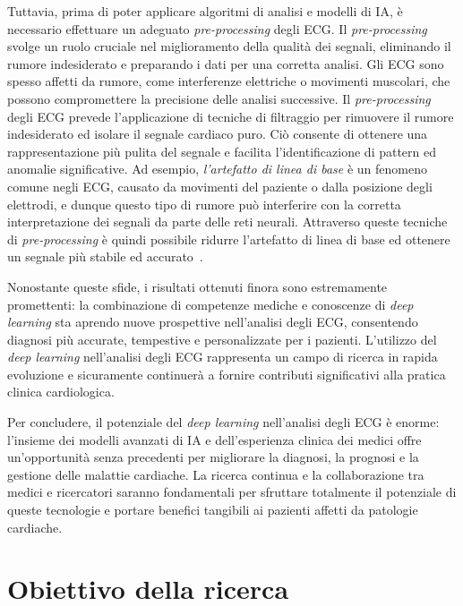 \documentclass[12pt,italian]{report}
\begin{document}
	Tuttavia, prima di poter applicare algoritmi di analisi e modelli di IA, è necessario effettuare un adeguato \textit{pre-processing} degli ECG. Il \textit{pre-processing} svolge un ruolo cruciale nel miglioramento della qualità dei segnali, eliminando il rumore indesiderato e preparando i dati per una corretta analisi. Gli ECG sono spesso affetti da rumore, come interferenze elettriche o movimenti muscolari, che possono compromettere la precisione delle analisi successive. Il \textit{pre-processing} degli ECG prevede l'applicazione di tecniche di filtraggio per rimuovere il rumore indesiderato ed isolare il segnale cardiaco puro. Ciò consente di ottenere una rappresentazione più pulita del segnale e facilita l'identificazione di pattern ed anomalie significative. Ad esempio, \textit{l'artefatto di linea di base} è un fenomeno comune negli ECG, causato da movimenti del paziente o dalla posizione degli elettrodi, e dunque questo tipo di rumore può interferire con la corretta interpretazione dei segnali da parte delle reti neurali. Attraverso queste tecniche di \textit{pre-processing} è quindi possibile ridurre l'artefatto di linea di base ed ottenere un segnale più stabile ed accurato~\cite{use}.
	
	Nonostante queste sfide, i risultati ottenuti finora sono estremamente promettenti: la combinazione di competenze mediche e conoscenze di \textit{deep learning} sta aprendo nuove prospettive nell'analisi degli ECG, consentendo diagnosi più accurate, tempestive e personalizzate per i pazienti. L'utilizzo del \textit{deep learning} nell'analisi degli ECG rappresenta un campo di ricerca in rapida evoluzione e sicuramente continuerà a fornire contributi significativi alla pratica clinica cardiologica.
	
	Per concludere, il potenziale del \textit{deep learning} nell'analisi degli ECG è enorme: l'insieme dei modelli avanzati di IA e dell'esperienza clinica dei medici offre un'opportunità senza precedenti per migliorare la diagnosi, la prognosi e la gestione delle malattie cardiache. La ricerca continua e la collaborazione tra medici e ricercatori saranno fondamentali per sfruttare totalmente il potenziale di queste tecnologie e portare benefici tangibili ai pazienti affetti da patologie cardiache.
	
	
	\section{Obiettivo della ricerca}
	\label{sec:obiettivo}
	
\end{document}
